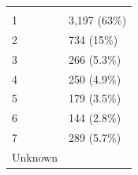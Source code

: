 \documentclass[]{article}
\begin{document}
\begin{longtable}[]{@{}ll@{}}
\begin{minipage}[t]{0.23\columnwidth}
\strut
\end{minipage}\tabularnewline
\begin{minipage}[t]{0.71\columnwidth}\raggedright
1\strut
\end{minipage} & \begin{minipage}[t]{0.23\columnwidth}\raggedright
3,197 (63\%)\strut
\end{minipage}\tabularnewline
\begin{minipage}[t]{0.71\columnwidth}\raggedright
2\strut
\end{minipage} & \begin{minipage}[t]{0.23\columnwidth}\raggedright
734 (15\%)\strut
\end{minipage}\tabularnewline
\begin{minipage}[t]{0.71\columnwidth}\raggedright
3\strut
\end{minipage} & \begin{minipage}[t]{0.23\columnwidth}\raggedright
266 (5.3\%)\strut
\end{minipage}\tabularnewline
\begin{minipage}[t]{0.71\columnwidth}\raggedright
4\strut
\end{minipage} & \begin{minipage}[t]{0.23\columnwidth}\raggedright
250 (4.9\%)\strut
\end{minipage}\tabularnewline
\begin{minipage}[t]{0.71\columnwidth}\raggedright
5\strut
\end{minipage} & \begin{minipage}[t]{0.23\columnwidth}\raggedright
179 (3.5\%)\strut
\end{minipage}\tabularnewline
\begin{minipage}[t]{0.71\columnwidth}\raggedright
6\strut
\end{minipage} & \begin{minipage}[t]{0.23\columnwidth}\raggedright
144 (2.8\%)\strut
\end{minipage}\tabularnewline
\begin{minipage}[t]{0.71\columnwidth}\raggedright
7\strut
\end{minipage} & \begin{minipage}[t]{0.23\columnwidth}\raggedright
289 (5.7\%)\strut
\end{minipage}\tabularnewline
\begin{minipage}[t]{0.71\columnwidth}\raggedright
Unknown\strut
\end{minipage} & \begin{minipage}[t]{0.23\columnwidth}\raggedright

\end{minipage}
\end{longtable}
\end{document}
